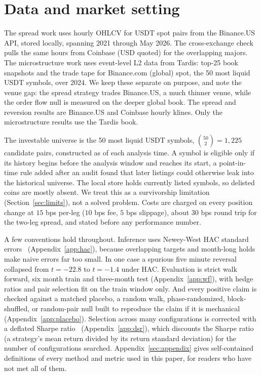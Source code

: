 \documentclass[11pt]{article}
\begin{document}
\section{Data and market setting}
\label{sec:methods}

The spread work uses hourly OHLCV for USDT spot pairs from the Binance.US API, stored locally,
spanning 2021 through May 2026. The cross-exchange check pulls the same hours from Coinbase
(USD quoted) for the overlapping majors. The microstructure work uses event-level L2 data
from Tardis: top-25 book snapshots and the trade tape for Binance.com (global) spot, the 50 most liquid USDT
symbols, over 2024. We keep these separate on purpose, and note the venue gap: the spread strategy trades Binance.US, a
much thinner venue, while the order flow null is measured on the deeper global book. The spread and
reversion results are Binance.US and Coinbase hourly klines. Only the microstructure results use
the Tardis book.

The investable universe is the 50 most liquid USDT symbols, $\binom{50}{2}=1{,}225$ candidate
pairs, constructed as of each analysis time. A
symbol is eligible only if its history begins before the analysis window and reaches its start, a
point-in-time rule added after an audit found that later listings could otherwise leak into the
historical universe. The local store holds currently listed symbols, so delisted coins are mostly
absent. We treat this as a survivorship limitation (Section~\ref{sec:limits}), not a solved
problem. Costs are charged on every position change at $15$ bps per-leg ($10$ bps fee, $5$ bps
slippage), about $30$ bps round trip for the two-leg spread, and stated before any performance
number.

A few conventions hold throughout. Inference uses Newey-West HAC standard
errors~\cite{newey1987hac} (Appendix~\ref{app:hac}), because overlapping
targets and month-long holds make naive errors far too small. In one case a spurious five minute
reversal collapsed from $t = -22.8$ to $t = -1.4$ under HAC. Evaluation is strict walk forward,
six month train and three-month test (Appendix~\ref{app:wf}), with hedge ratios and pair selection fit on the train
window only. And every positive claim is checked against a matched placebo, a random walk,
phase-randomized, block-shuffled, or random-pair null built to reproduce the claim if it is
mechanical (Appendix~\ref{app:placebo}). Selection across many configurations is corrected with a deflated Sharpe
ratio~\cite{bailey2014dsr} (Appendix~\ref{app:dsr}), which discounts the Sharpe ratio (a strategy's mean return divided by its return standard deviation) for the number of configurations searched. Appendix~\ref{sec:appendix} gives self-contained definitions of every method and metric used in this paper, for readers who have not met all of them.
\end{document}
